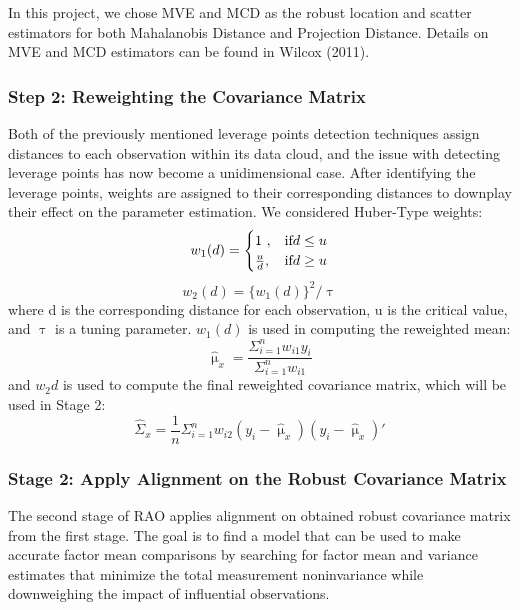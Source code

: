 \documentclass[
  man]{apa7}
\let\mu\upmu
\let\tau\uptau
\begin{document}
In this project, we chose MVE and MCD as the robust location and scatter estimators for both Mahalanobis Distance and Projection Distance. Details on MVE and MCD estimators can be found in Wilcox (2011).

\subsubsection{Step 2: Reweighting the Covariance Matrix}\label{step-2-reweighting-the-covariance-matrix}

Both of the previously mentioned leverage points detection techniques assign distances to each observation within its data cloud, and the issue with detecting leverage points has now become a unidimensional case. After identifying the leverage points, weights are assigned to their corresponding distances to downplay their effect on the parameter estimation. We considered Huber-Type weights:
\begin{equation}
w_{1}(d) =
\begin{cases}
 1\ ,& \text{if} \space d \leq u\\
 \frac{u}{d} ,& \text{if} \space d \ge u
 \end{cases}       
\end{equation}
\begin{equation}
w_{2}(d) = \{w_{1}(d)\}^{2}/\tau
\end{equation}
where d is the corresponding distance for each observation, u is the critical value, and \(\tau\) is a tuning parameter. \(w_{1}(d)\) is used in computing the reweighted mean:
\begin{equation}
\hat{\mu}_{x} = \frac{\Sigma_{i=1}^{n}w_{i1}y_{i}}{\Sigma_{i=1}^{n}w_{i1}}
\end{equation}
and \(w_{2}d\) is used to compute the final reweighted covariance matrix, which will be used in Stage 2:
\begin{equation}
\hat{\Sigma}_{x} = \frac{1}{n}\Sigma_{i=1}^{n}w_{i2}(y_{i}-\hat{\mu}_{x})(y_{i}-\hat{\mu}_{x})'
\end{equation}

\subsubsection{Stage 2: Apply Alignment on the Robust Covariance Matrix}\label{stage-2-apply-alignment-on-the-robust-covariance-matrix}

The second stage of RAO applies alignment on obtained robust covariance matrix from the first stage. The goal is to find a model that can be used to make accurate factor mean comparisons by searching for factor mean and variance estimates that minimize the total measurement noninvariance while downweighing the impact of influential observations.
\end{document}
